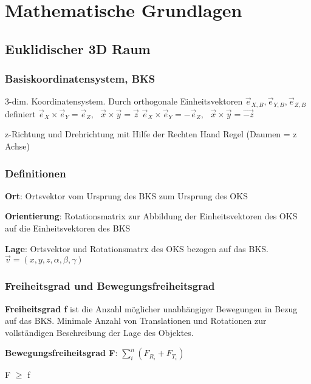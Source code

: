 \chapter{Mathematische Grundlagen}

\section{Euklidischer 3D Raum}
\subsection{Basiskoordinatensystem, BKS}
3-dim. Koordinatensystem. Durch orthogonale Einheitsvektoren $\vec{e}_{X,B}, \vec{e}_{Y,B},
\vec{e}_{Z,B}$ definiert
 $\vec{e}_{X} \times \vec{e}_{Y} = \vec{e}_{Z},\text{ }\vec{x} \times \vec{y} = \vec{z}$
 $\vec{e}_{X} \times \vec{e}_{Y} = -\vec{e}_{Z},\text{ }\vec{x} \times \vec{y} = \vec{-z}$

z-Richtung und Drehrichtung mit Hilfe der Rechten Hand Regel (Daumen = z Achse)

\subsection{Definitionen}
\begin{compactitem}
    \item \textbf{Ort}: Ortsvektor vom Ursprung des BKS zum Ursprung des OKS
    \item \textbf{Orientierung}: Rotationsmatrix zur Abbildung der Einheitsvektoren des OKS auf die
    Einheitsvektoren des BKS
    \item \textbf{Lage}: Ortsvektor und Rotationsmatrx des OKS bezogen auf das BKS.
    $\vec{v} = (x,y,z,\alpha,\beta,\gamma)$
\end{compactitem}

\subsection{Freiheitsgrad und Bewegungsfreiheitsgrad}
\begin{compactitem}
    \item \textbf{Freiheitsgrad f} ist die Anzahl möglicher unabhängiger Bewegungen in Bezug auf
    das BKS. Minimale Anzahl von Translationen und Rotationen zur vollständigen Beschreibung der Lage des
    Objektes.
    \item \textbf{Bewegungsfreiheitsgrad F}: $\sum_{i}^n(F_{R_i} + F_{T_i})$
    \item F $\geq$ f
\end{compactitem}
\newpage

